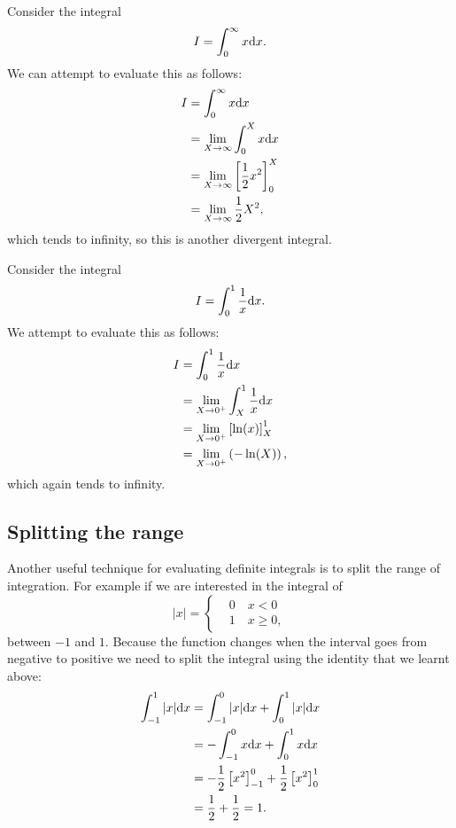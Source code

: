 \begin{ex}
Consider the integral 
\begin{equation*}
I=\int_{0}^{\infty}x\mathrm{d} x.
\end{equation*}
We can attempt to evaluate this as follows:
\begin{align*}
I 	&=\int_{0}^{\infty}x\mathrm{d} x\\
	&=\lim_{X\to \infty}\int_{0}^{X}x\mathrm{d} x\\
	&=\lim_{X\to \infty}\left[\frac{1}{2}x^{2}\right]_{0}^{X}\\
	&=\lim_{X\to\infty}\frac{1}{2}X^{2},
\end{align*}
which tends to infinity, so this is another divergent integral.
\end{ex}

\begin{ex}
Consider the integral 
\begin{equation*}
I=\int_{0}^{1}\frac{1}{x}\mathrm{d} x.
\end{equation*}
We attempt to evaluate this as follows:
\begin{align*}
I 	&=\int_{0}^{1}\frac{1}{x}\mathrm{d} x\\
	&=\lim_{X\to 0^{+}}\int_{X}^{1}\frac{1}{x}\mathrm{d} x\\
	&=\lim_{X\to 0^{+}}\left[\ln(x)\right]_{X}^{1}\\
	&=\lim_{X\to 0^{+}}\left(-\ln(X)\right),
\end{align*}
which again tends to infinity.
\end{ex}

\subsection*{Splitting the range}
Another useful technique for evaluating definite integrals is to split the range of integration. For example if we are interested in the integral of 
\begin{equation*}
\vert x\vert=\begin{cases}
&0 \quad x < 0\\
&1 \quad x\geq 0,
\end{cases}
\end{equation*}
between $-1$ and $1$. Because the function changes when the interval goes from negative to positive we need to split the integral using the identity that we learnt above:
\begin{align*}
\int_{-1}^{1}\vert x\vert\mathrm{d} x 	&=\int_{-1}^{0}\vert x\vert\mathrm{d} x+\int_{0}^{1}\vert x\vert\mathrm{d} x\\
					&=-\int_{-1}^{0}x\mathrm{d} x+\int_{0}^{1}x\mathrm{d} x\\
					&=-\frac{1}{2}\left[x^{2}\right]_{-1}^{0}+\frac{1}{2}\left[x^{2}\right]_{0}^{1}\\
					&=\frac{1}{2}+\frac{1}{2}=1.
\end{align*}

